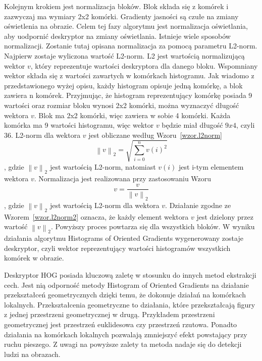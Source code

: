\documentclass[a4paper,twoside,12pt]{book}
\begin{document}
    Kolejnym krokiem jest normalizacja bloków. Blok składa się z komórek i zazwyczaj ma wymiary 2x2 komórki.
    Gradienty jasności są czułe na zmiany oświetlenia na obrazie. Celem tej fazy algorytmu jest normalizacja oświetlania,
    aby uodpornić deskryptor na zmiany oświetlania.
    Istnieje wiele sposobów normalizacji. Zostanie tutaj opisana normalizacja za pomocą parametru L2-norm.
    Najpierw zostaje wyliczona wartość L2-norm. L2 jest wartością normalizującą wektor $v$, który reprezentuje wartości
    deskryptora dla danego bloku. Wspomniany wektor składa się z wartości zawartych w komórkach histogramu. Jak wiadomo z
    przedstawionego wyżej opisu, każdy histogram opisuje jedną komórkę, a blok zawiera n komórek.
    Przyjmując, że histogram reprezentujący komórkę posiada 9 wartości oraz rozmiar bloku
    wynosi 2x2 komórki, można wyznaczyć długość wektora $v$.
    Blok ma 2x2 komórki, więc zawiera w sobie 4 komórki. Każda komórka ma 9 wartości histogramu, więc wektor $v$ będzie
    miał długość $9x4$, czyli 36.
    L2-norm dla wektora $v$ jest obliczane według Wzoru~\ref{wzor.l2norm}
    \large
    \begin{equation}
        \left \|v  \right \|_{2}=\sqrt{\sum_{i=0}^{n}v(i)^{2}}
        \label{wzor.l2norm}
    \end{equation}
    \normalsize
    , gdzie $\left \|v  \right \|_{2}$ jest wartością L2-norm, natomiast $v(i)$ jest i-tym elementem wektora $v$.
    Normalizacja jest realizowana przy zastosowaniu Wzoru
    \large
    \begin{equation}
        v = \frac{v}{\left \|v  \right \|_{2}}
        \label{wzor.l2norm2}
    \end{equation}
    \normalsize
    , gdzie $\left \|v  \right \|_{2}$ jest wartością L2-norm dla wektora $v$. Działanie zgodne ze
    Wzorem~\ref{wzor.l2norm2} oznacza, że każdy element wektora $v$ jest dzielony przez wartość
    $\left \|v  \right\|_{2}$.
    Powyższy proces powtarza się dla wszystkich bloków.
    W wyniku działania algorytmu Histograms of Oriented Gradients wygenerowany zostaje deskryptor, czyli wektor
    reprezentujący wartości histogramów wszystkich komórek w obrazie.

    Deskryptor HOG posiada kluczową zaletę w stosunku do innych metod ekstrakcji cech.
    Jest nią odporność metody Histogram of Oriented Gradients na działanie przekształceń geometrycznych
    dzięki temu, że dokonuje działań na komórkach lokalnych.
    Przekształcenia geometryczne to działania, które przekształcają figury z jednej przestrzeni geometrycznej w drugą.
    Przykładem przestrzeni geometrycznej jest przestrzeń euklidesowa czy przestrzeń rzutowa.
    Ponadto działania na komórkach lokalnych pozwalają zmniejszyć efekt powstający przy ruchu pieszego.
    Z uwagi na powyższe zalety ta metoda nadaje się do detekcji ludzi na obrazach.
\end{document}
